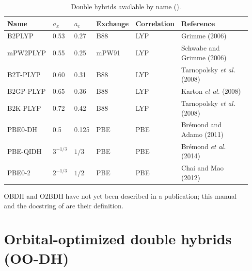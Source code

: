 \begin{table}[!htb]
\centering
\small
\caption{Double hybrids available by name ().}
\label{tab:dh}
\begin{tabular}{@{}l l l l l l@{}}
\toprule
Name & $a_x$ & $a_c$ & Exchange & Correlation & Reference \\
\midrule
B2PLYP    & 0.53 & 0.27  & B88   & LYP & Grimme (2006) \\
mPW2PLYP  & 0.55 & 0.25  & mPW91 & LYP & Schwabe and Grimme (2006) \\
B2T-PLYP  & 0.60 & 0.31  & B88   & LYP & Tarnopolsky \emph{et al.} (2008) \\
B2GP-PLYP & 0.65 & 0.36  & B88   & LYP & Karton \emph{et al.} (2008) \\
B2K-PLYP  & 0.72 & 0.42  & B88   & LYP & Tarnopolsky \emph{et al.} (2008) \\
PBE0-DH   & 0.5  & 0.125 & PBE   & PBE & Br\'emond and Adamo (2011) \\
PBE-QIDH  & $3^{-1/3}$ & $1/3$ & PBE & PBE & Br\'emond \emph{et al.} (2014) \\
PBE0-2    & $2^{-1/3}$ & $1/2$ & PBE & PBE & Chai and Mao (2012) \\
\bottomrule
\end{tabular}
\end{table}

OBDH and O2BDH have not yet been described in a publication; this manual and
the docstring of  are their definition.

\section{Orbital-optimized double hybrids (OO-DH)}
\label{sec:theory-oodh}

